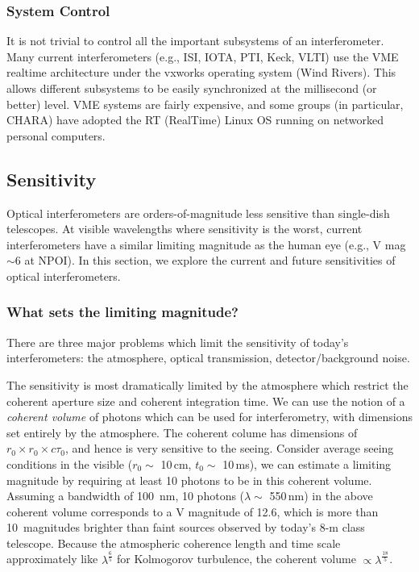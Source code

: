 \documentclass[12pt]{article}
\begin{document}
\subsubsection{System Control}

It is not trivial to control all the important subsystems of an
interferometer.  Many current interferometers (e.g., ISI, IOTA, PTI,
Keck, VLTI) use the VME realtime architecture under the vxworks
operating system (Wind Rivers).  This allows different subsystems to
be easily synchronized at the millisecond (or better) level.  VME systems are
fairly expensive, and some groups (in particular, CHARA) have adopted
the RT (RealTime) Linux OS running on networked personal computers.


\subsection{Sensitivity}
\label{sensitivity}

Optical interferometers are orders-of-magnitude less sensitive than
single-dish telescopes.  At visible wavelengths where sensitivity is
the worst, current interferometers have a similar limiting magnitude
as the human eye (e.g., V mag $\sim$6 at NPOI). In this section, we explore
the current and future sensitivities of optical interferometers.

\subsubsection{What sets the limiting magnitude?}
There are three major problems which limit the sensitivity of today's
interferometers: the atmosphere, optical transmission,
detector/background noise.

The sensitivity is most dramatically limited by the atmosphere which
restrict the coherent aperture size and coherent integration time.  We
can use the notion of a {\em coherent volume} of photons which can be
used for interferometry, with dimensions set entirely by the
atmosphere.  The coherent colume has dimensions of $r_0 \times r_0
\times c \tau_0$, and hence is very sensitive to the seeing.  Consider
average seeing conditions in the visible ($r_0 \sim$ 10\,cm, $t_0
\sim$ 10\,ms), we can estimate a limiting magnitude by requiring at
least 10 photons to be in this coherent volume.  Assuming a bandwidth
of 100~nm, 10 photons ($\lambda\sim$ 550\,nm) in the above coherent
volume corresponds to a V magnitude of 12.6, which is more than
10~magnitudes brighter than faint sources observed by today's 8-m
class telescope.  Because the atmospheric coherence length and time
scale approximately like $\lambda^{\frac{6}{5}}$ for Kolmogorov
turbulence, the coherent volume $\propto \lambda^\frac{18}{5}$.
\end{document}
